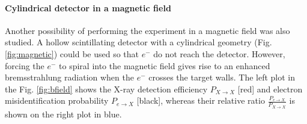 \documentclass[12pt]{article}
\begin{document}
\paragraph{Cylindrical detector in a magnetic field}
Another possibility of performing the experiment in a magnetic field was also studied. A hollow scintillating detector with a cylindrical geometry (Fig. \ref{fig:magnetic}) could be used so that $e^-$ do not reach the detector. However, forcing the $e^-$ to spiral into the magnetic field gives rise to an enhanced bremsstrahlung radiation when the $e^-$ crosses the target walls. The left plot in the Fig. \ref{fig:bfield} shows the X-ray detection efficiency $P_{X \rightarrow X}$ [red] and electron misidentification probability $P_{e \rightarrow X}$ [black], whereas their relative ratio $\frac{P_{e \rightarrow X}}{P_{X \rightarrow X}}$ is shown on the right plot in blue. 














\end{document}
